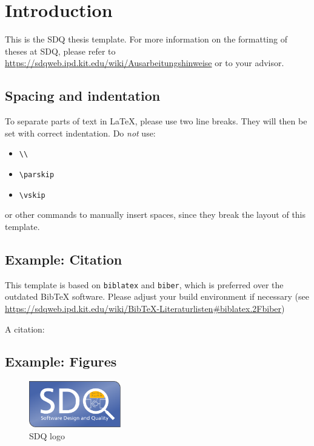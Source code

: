 
\chapter{Introduction}
\label{ch:Introduction}


This is the SDQ thesis template.
For more information on the formatting of theses at SDQ, please refer to
\url{https://sdqweb.ipd.kit.edu/wiki/Ausarbeitungshinweise} or to your advisor.

\section{Spacing and indentation}
To separate parts of text in \LaTeX, please use two line breaks.
They will then be set with correct indentation.
Do \emph{not} use:
\begin{itemize}
  \itemsep0em
  \item \texttt{\textbackslash\textbackslash}
  \item \texttt{\textbackslash parskip}
  \item \texttt{\textbackslash vskip}
\end{itemize} 
or other commands to manually insert spaces, since they break the layout of this template.

\section{Example: Citation}
\label{sec:Introduction:Citation}
This template is based on \texttt{biblatex} and \texttt{biber}, which is preferred over the
outdated Bib\TeX{} software.
Please adjust your build environment if necessary (see
\url{https://sdqweb.ipd.kit.edu/wiki/BibTeX-Literaturlisten#biblatex.2Fbiber})

A citation: \cite{becker2008a} 

\section{Example: Figures}
\label{sec:Introduction:Figures}
\begin{figure}
\centering
\includegraphics[width=4cm]{logos/sdqlogo}
\caption{SDQ logo}
\label{fig:sdqlogo}
\end{figure}

